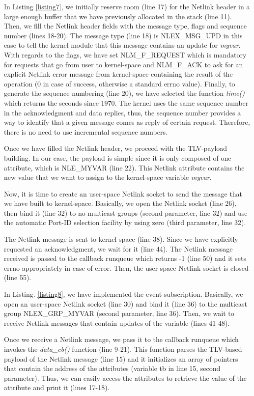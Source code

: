 \documentclass[10pt,onecolumn]{article}
\begin{document}
In Listing \ref{listing7}, we initially reserve room (line 17) for the Netlink header in a large enough buffer that we have previously allocated in the stack (line 11). Then, we fill the Netlink header fields with the message type, flags and sequence number (lines 18-20). The message type (line 18) is NLEX\_MSG\_UPD in this case to tell the kernel module that this message contains an update for \textit{myvar}. With regards to the flags, we have set NLM\_F\_REQUEST which is mandatory for requests that go from user to kernel-space and NLM\_F\_ACK to ask for an explicit Netlink error message from kernel-space containing the result of the operation (0 in case of success, otherwise a standard errno value). Finally, to generate the sequence numbering (line 20), we have selected the function \textit{time()} which returns the seconds since 1970. The kernel uses the same sequence number in the acknowledgment and data replies, thus, the sequence number provides a way to identify that a given message comes as reply of certain request. Therefore, there is no need to use incremental sequence numbers.

Once we have filled the Netlink header, we proceed with the TLV-payload building. In our case, the payload is simple since it is only composed of one attribute, which is NLE\_MYVAR (line 22). This Netlink attribute contains the new value that we want to assign to the kernel-space variable \textit{myvar}.

Now, it is time to create an user-space Netlink socket to send the message that we have built to kernel-space. Basically, we open the Netlink socket (line 26), then bind it (line 32) to no multicast groups (second parameter, line 32) and use the automatic Port-ID selection facility by using zero (third parameter, line 32).

The Netlink message is sent to kernel-space (line 38). Since we have explicitly requested an acknowledgment, we wait for it (line 44). The Netlink message received is passed to the callback runqueue which returns -1 (line 50) and it sets errno appropriately in case of error. Then, the user-space Netlink socket is closed (line 55).

In Listing. \ref{listing8}, we have implemented the event subscription. Basically, we open an user-space Netlink socket (line 30) and bind it (line 36) to the multicast group NLEX\_GRP\_MYVAR (second parameter, line 36). Then, we wait to receive Netlink messages that contain updates of the variable (lines 41-48).

Once we receive a Netlink message, we pass it to the callback runqueue which invokes the \textit{data\_cb()} function (line 9-21). This function parses the TLV-based payload of the Netlink message (line 15) and it initializes an array of pointers that contain the address of the attributes (variable tb in line 15, second parameter). Thus, we can easily access the attributes to retrieve the value of the attribute and print it (lines 17-18).
\end{document}
